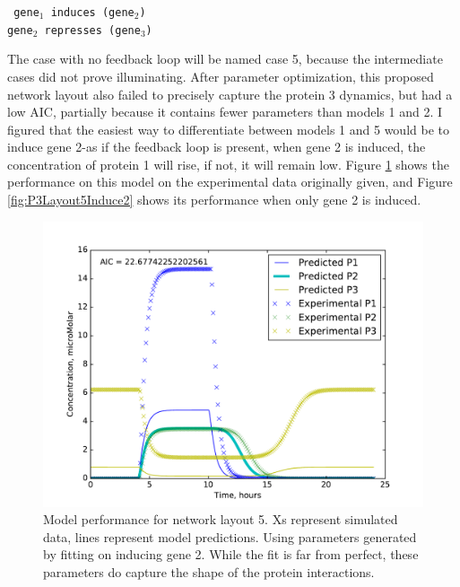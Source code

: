 \documentclass{article}
\begin{document}
\begin{centering}
\texttt{
gene$_1$ induces (gene$_2$)\\
gene$_2$ represses (gene$_3$)\\
}
\end{centering}

The case with no feedback loop will be named case 5, because the intermediate cases did not prove illuminating. After parameter optimization, this proposed network layout also failed to precisely capture the protein 3 dynamics, but had a low AIC, partially because it contains fewer parameters than models 1 and 2. I figured that the easiest way to differentiate between models 1 and 5 would be to induce gene 2-as if the feedback loop is present, when gene 2 is induced, the concentration of protein 1 will rise, if not, it will remain low. Figure \ref{fig:P3Layout5} shows the performance on this model on the experimental data originally given, and Figure \ref{fig:P3Layout5Induce2} shows its performance when only gene 2 is induced.  
\begin{figure}[h!]
\includegraphics[width=12cm]{../Problem3/figures/postNMPlotLayout5WGene2Info}
\caption{Model performance for network layout 5. Xs represent simulated data, lines represent model predictions. Using parameters generated by fitting on inducing gene 2. While the fit is far from perfect, these parameters do capture the shape of the protein interactions.}
\label{fig:P3Layout5}
\end{figure}
\end{document}
